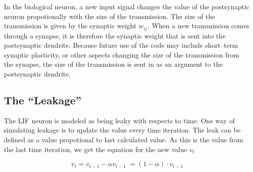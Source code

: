	In the biological neuron, a new input signal changes the value of the postsynaptic neuron propotionally with the size of the transmission.
	The size of the transmission is given by the synaptic weight $w_{ij}$.
	When a new transmission comes through a synapse, it is therefore the synaptic weight that is sent into the postsynaptic dendrite.
	Because future use of the code may include short--term synaptic plasticity, or other aspects changing the size of the transmission from the synapse, the size of the transmission is sent in as an argument to the postsynaptic dendrite.



%

	\subsection{The ``Leakage''}
	\label{secTheLeakageForSANN}

	The LIF neuron is modeled as being leaky with respects to time. %
	One way of simulating leakage is to update the value every time iteration. %
	The leak can be defined as a value propotional to last calculated value.
	As this is the value from the last time iteration, we get the equation for the new value $v_t$
	
	\begin{equation}
		v_t = v_{t-1} - \alpha v_{t-1} \; = (1-\alpha) \cdot v_{t-1}
		\label{eqOppdateringAvVerdiEtterLekkasjeSimpelVariant}
	\end{equation}

